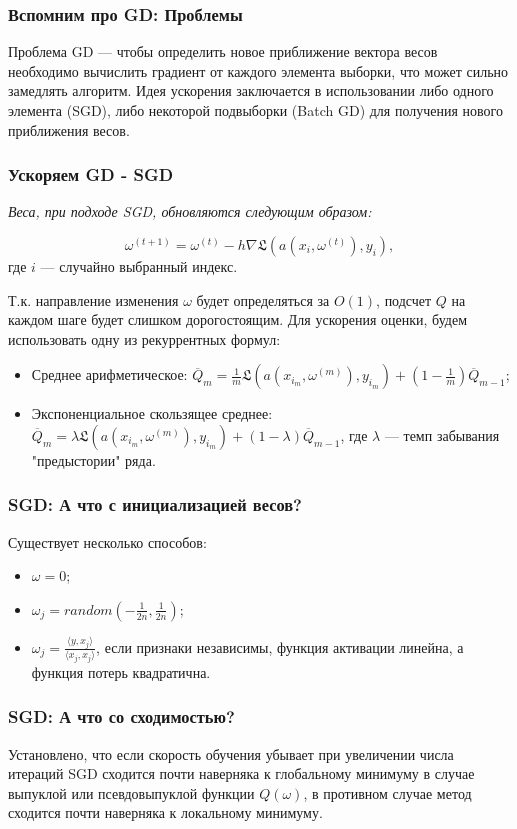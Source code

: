 \documentclass[11pt]{beamer}
\begin{document}
	
	\begin{frame}
		\frametitle{Вспомним про GD: Проблемы}
		Проблема GD --- чтобы определить новое приближение вектора весов необходимо вычислить градиент от каждого элемента выборки, что может сильно замедлять алгоритм.
		Идея ускорения заключается в использовании либо одного элемента (SGD), либо некоторой подвыборки (Batch GD) для получения нового приближения весов. 
		
		
		
	\end{frame}

	\begin{frame}
		\frametitle{Ускоряем GD - SGD}
		\textit{Веса, при подходе SGD, обновляются следующим образом:}
		
		$$ \omega^{(t+1)} = \omega^{(t)} - h\nabla\mathfrak{L}(a(x_i, \omega^{(t)}), y_i),$$ где $ i $ --- случайно выбранный индекс.
		
		Т.к. направление изменения $ \omega $ будет определяться за $ O(1) $, подсчет $ Q $ на каждом шаге будет слишком дорогостоящим. Для ускорения оценки, будем использовать одну из рекуррентных формул:
		\begin{itemize}
			\item Среднее арифметическое: $ \overline Q_m = \frac{1}{m}\mathfrak{L}(a(x_{i_m}, \omega^{(m)}), y_{i_m}) + (1 - \frac{1}{m}) \overline Q_{m-1}$;
			\item Экспоненциальное скользящее среднее: $ \overline Q_m = \lambda\mathfrak{L}(a(x_{i_m}, \omega^{(m)}), y_{i_m}) + (1 - \lambda) \overline Q_{m-1}$, где $ \lambda $ --- темп забывания "предыстории" ряда.
		\end{itemize}
	\end{frame}

	\begin{frame}
		\frametitle{SGD: А что с инициализацией весов?}
		Существует несколько способов:
		\begin{itemize}
			\item $ \omega = 0 $;
			\item $ \omega_j = random(-\frac{1}{2n}, \frac{1}{2n}) $;
			\item $ \omega_j = \frac{\langle y, x_j \rangle}{\langle x_j, x_j \rangle} $, если признаки независимы, функция активации линейна, а функция потерь квадратична.
		\end{itemize}
	\end{frame}

	\begin{frame}
		\frametitle{SGD: А что со сходимостью?}
		Установлено, что если скорость обучения убывает при увеличении числа итераций SGD сходится почти наверняка к глобальному минимуму в случае выпуклой или псевдовыпуклой функции $ Q(\omega) $, в противном случае метод сходится почти наверняка к локальному минимуму.
	\end{frame}
\end{document}
